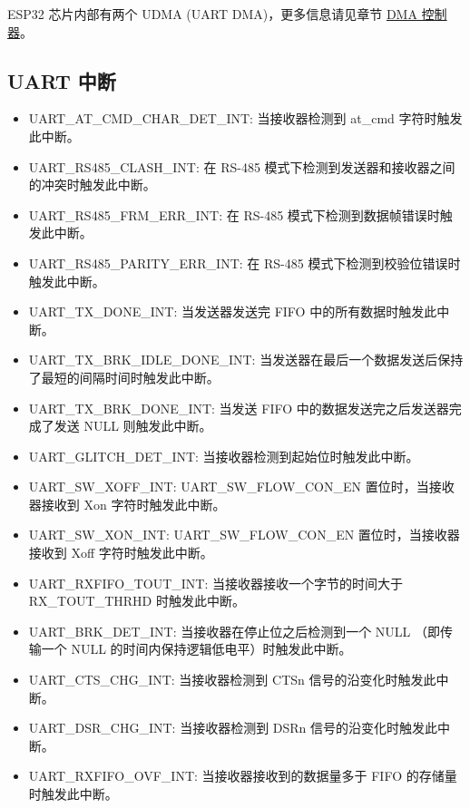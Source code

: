 \documentclass[main\_\_CN.tex]{subfiles}
\begin{document}
ESP32 芯片内部有两个 UDMA (UART DMA)，更多信息请见章节 \hyperref[mod:dma]{DMA 控制器}。

\subsection{UART 中断}
\begin{itemize}
\item \label{int:UARTATCMDCHARDETINT}UART\_AT\_CMD\_CHAR\_DET\_INT: 当接收器检测到 at\_cmd 字符时触发此中断。
\item \label{int:UARTRS485CLASHINT}UART\_RS485\_CLASH\_INT: 在 RS-485 模式下检测到发送器和接收器之间的冲突时触发此中断。
\item \label{int:UARTRS485FRMERRINT}UART\_RS485\_FRM\_ERR\_INT: 在 RS-485 模式下检测到数据帧错误时触发此中断。
\item \label{int:UARTRS485PARITYERRINT}UART\_RS485\_PARITY\_ERR\_INT: 在 RS-485 模式下检测到校验位错误时触发此中断。
\item \label{int:UARTTXDONEINT}UART\_TX\_DONE\_INT: 当发送器发送完 FIFO 中的所有数据时触发此中断。
\item \label{int:UARTTXBRKIDLEDONEINT}UART\_TX\_BRK\_IDLE\_DONE\_INT: 当发送器在最后一个数据发送后保持了最短的间隔时间时触发此中断。
\item \label{int:UARTTXBRKDONEINT}UART\_TX\_BRK\_DONE\_INT: 当发送 FIFO 中的数据发送完之后发送器完成了发送 NULL 则触发此中断。
\item \label{int:UARTGLITCHDETINT}UART\_GLITCH\_DET\_INT: 当接收器检测到起始位时触发此中断。
\item \label{int:UARTSWXOFFINT}UART\_SW\_XOFF\_INT: UART\_SW\_FLOW\_CON\_EN 置位时，当接收器接收到 Xon 字符时触发此中断。
\item \label{int:UARTSWXONINT}UART\_SW\_XON\_INT: UART\_SW\_FLOW\_CON\_EN 置位时，当接收器接收到 Xoff 字符时触发此中断。
\item \label{int:UARTRXFIFOTOUTINT}UART\_RXFIFO\_TOUT\_INT: 当接收器接收一个字节的时间大于 RX\_TOUT\_THRHD 时触发此中断。
\item \label{int:UARTBRKDETINT}UART\_BRK\_DET\_INT: 当接收器在停止位之后检测到一个 NULL （即传输一个 NULL 的时间内保持逻辑低电平）时触发此中断。
\item \label{int:UARTCTSCHGINT}UART\_CTS\_CHG\_INT: 当接收器检测到 CTSn 信号的沿变化时触发此中断。
\item \label{int:UARTDSRCHGINT}UART\_DSR\_CHG\_INT: 当接收器检测到 DSRn 信号的沿变化时触发此中断。
\item \label{int:UARTRXFIFOOVFINT}UART\_RXFIFO\_OVF\_INT: 当接收器接收到的数据量多于 FIFO 的存储量时触发此中断。

\end{itemize}
\end{document}
